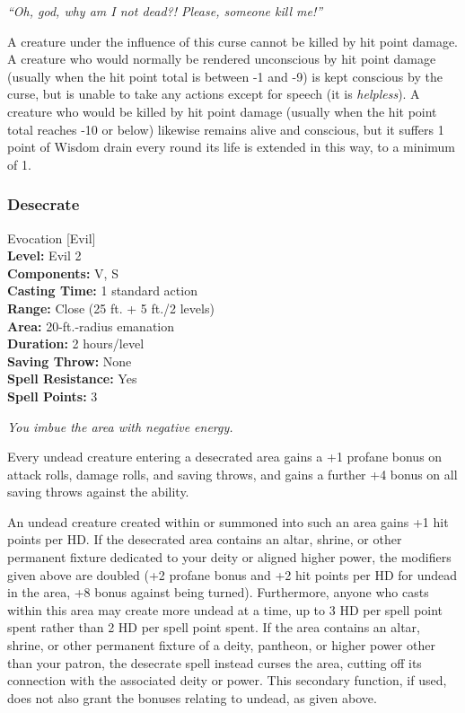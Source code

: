 \emph{``Oh, god, why am I not dead?! Please, someone kill me!''}

A creature under the influence of this curse cannot be killed by hit point damage. 
A creature who would normally be rendered unconscious by hit point damage (usually when the hit point total is between -1 and -9) is kept conscious by the curse, but is unable to take any actions except for speech (it is \emph{helpless}).
A creature who would be killed by hit point damage (usually when the hit point total reaches -10 or below) likewise remains alive and conscious, but it suffers 1 point of Wisdom drain every round its life is extended in this way, to a minimum of 1.
\subsubsection{Desecrate}
\label{Spell:Desecrate}
Evocation [Evil]
\\ \textbf{Level:} Evil 2
\\ \textbf{Components:} V, S
\\ \textbf{Casting Time:} 1 standard action
\\ \textbf{Range:} Close (25 ft. + 5 ft./2 levels)
\\ \textbf{Area:} 20-ft.-radius emanation
\\ \textbf{Duration:} 2 hours/level
\\ \textbf{Saving Throw:} None
\\ \textbf{Spell Resistance:} Yes
\\ \textbf{Spell Points:} 3

\emph{You imbue the area with negative energy.}

Every undead creature entering a desecrated area gains a +1 profane bonus on attack rolls, damage rolls, and saving throws,
and gains a further +4 bonus on all saving throws against the  ability.

An undead creature created within or summoned into such an area gains +1 hit points per HD.
If the desecrated area contains an altar, shrine, or other permanent fixture dedicated to your deity or aligned higher power, 
the modifiers given above are doubled (+2 profane bonus and +2 hit points per HD for undead in the area, +8 bonus against being turned). 
Furthermore, anyone who casts  within this area may create more undead at a time,
up to 3 HD per spell point spent rather than 2 HD per spell point spent.
If the area contains an altar, shrine, or other permanent fixture of a deity, pantheon, or higher power other than your
patron, the desecrate spell instead curses the area, cutting off its connection with the associated deity or power. 
This secondary function, if used, does not also grant the bonuses relating to undead, as given above.

